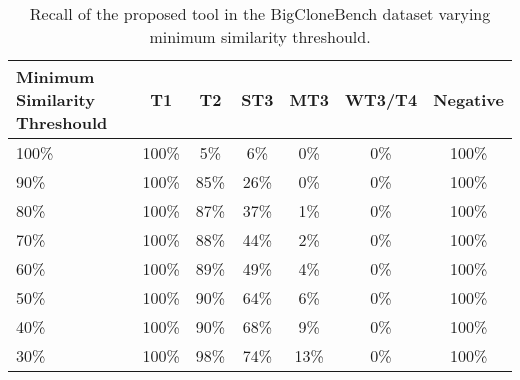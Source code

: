 \begin{table}
\begin{tabular}{ | m{6em} | c | c | c | c | c | c | }

\hline

\textbf{Minimum Similarity Threshould} & \textbf{T1} & \textbf{T2} & \textbf{ST3} & \textbf{MT3}
& \textbf{WT3/T4} & \textbf{Negative} \\ \hline 

100\% & 100\% & 5\% & 6\% & 0\% & 0\% & 100\% \\ \hline
90\% & 100\% & 85\% & 26\% & 0\% & 0\% & 100\% \\ \hline
80\% & 100\% & 87\% & 37\% & 1\% & 0\% & 100\% \\ \hline
70\% & 100\% & 88\% & 44\% & 2\% & 0\% & 100\% \\ \hline
60\% & 100\% & 89\% & 49\% & 4\% & 0\% & 100\% \\ \hline
50\% & 100\% & 90\% & 64\% & 6\% & 0\% & 100\% \\ \hline
40\% & 100\% & 90\% & 68\% & 9\% & 0\% & 100\% \\ \hline
30\% & 100\% & 98\% & 74\% & 13\% & 0\% & 100\% \\ \hline

\hline

\end{tabular}
\label{tab:bigclone}
\caption{Recall of the proposed tool in the BigCloneBench dataset varying minimum similarity threshould.}
\end{table}
